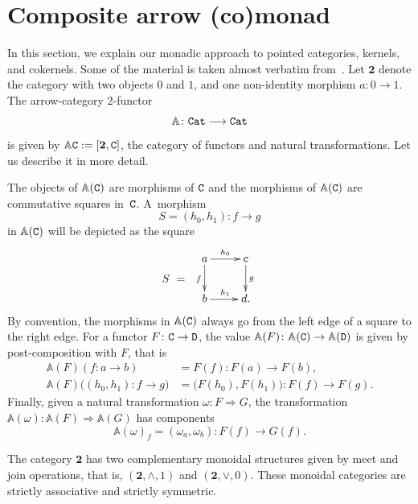 \documentclass[12pt,leqno]{amsart}
\theoremstyle{definition}
\def\Ar{\mathbb{A}}
\newcommand{\C}{{\tt C}}
\newcommand{\D}{\tt{D}}
\newcommand{\Cat}{{\tt Cat}}
\newcommand{\4}{\texttt{4}}
\newcommand{\jed}{\mathbf{1}}
\def\dvedve{\mathbf{2}}
\begin{document}
\section{Composite arrow (co)monad}
\label{Moc ji to tam nesedlo.}

In this section, we explain our monadic approach to pointed
categories, kernels, and cokernels. Some of the material is taken
almost verbatim
from~\cite{pasticio}. 
Let $\dvedve$ denote the category with two objects $0$ and $1$, and one
non-identity morphism $a\colon 0\to 1$. The arrow-category 2-functor
\[
\Ar\colon \Cat\longrightarrow \Cat
\]
is given by $\Ar\C:=[\dvedve,\C]$, the category of functors and natural
transformations. Let us describe it in more detail.

The objects of $\Ar (\C)$ are morphisms of $\C$ and the
morphisms of $\Ar (\C)$ are commutative squares
in~$\C$. A~morphism 
\[
S=(h_0,h_1)\colon f\longrightarrow g
\] 
in $\Ar (\C)$ will be
depicted as the square
\begin{equation}
\label{equation:square}  
    \raisebox{-1.8em}{$S\ =$ \ }
\xymatrix{a \ar[r]^{h_0} \ar[d]_{f}  & c \ar[d]^{g}
\\
b  \ar[r]^{h_1} & d.
}
\end{equation}
By convention, the morphisms in $\Ar (\C)$ always go 
from the left edge of a square to the right edge.
For a functor $F\colon \C\to \D$, the value
$\Ar  (F)\colon \Ar (\C) \to \Ar (\mathtt{D})$ 
is given by post-composition with $F$, that is 
\begin{align*}
\Ar  (F)(f\colon a\to b)&=F(f)\colon F(a) \longrightarrow F(b),
\\
\Ar  (F)\big((h_0,h_1)\colon f\to g\big)&=
\big(F(h_0), F(h_1)\big)\colon F(f)\longrightarrow F(g).
\end{align*}
Finally, given a natural 
transformation $\omega\colon F\Rightarrow G$, the transformation 
$\Ar  (\omega)\colon \Ar  (F) \Rightarrow \Ar  (G)$ has components 
\begin{equation}
    \label{Na koncert jede cely sbor vlakem}
\Ar (\omega)_{f}=(\omega_a,\omega_b)\colon F(f)\longrightarrow G(f).
\end{equation}

The category $\dvedve$ has two complementary monoidal structures given by meet and join operations, that is, $(\dvedve,\wedge,1)$ and $(\dvedve,\vee,0)$. 
These monoidal categories are strictly associative and strictly symmetric. %
\end{document}
